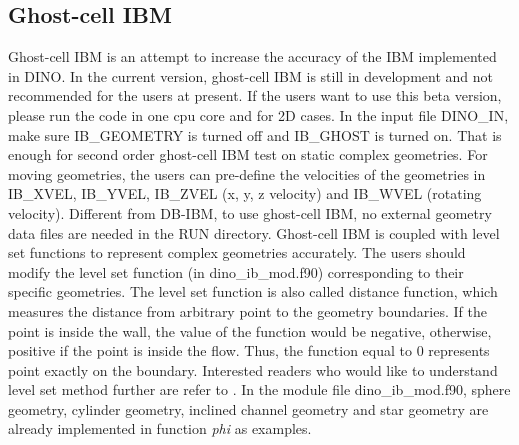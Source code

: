 \subsection{Ghost-cell IBM}
Ghost-cell IBM is an attempt to increase the accuracy of the IBM implemented in DINO. In the current version, ghost-cell IBM is still in development and not recommended for the users at present. If the users want to use this beta version, please run the code in one cpu core and for 2D cases. In the input file DINO\_IN, make sure IB\_GEOMETRY is turned off and IB\_GHOST is turned on. That is enough for second order ghost-cell IBM test on static complex geometries. For moving geometries, the users can pre-define the velocities of the geometries in IB\_XVEL, IB\_YVEL, IB\_ZVEL (x, y, z velocity) and IB\_WVEL (rotating velocity).
Different from DB-IBM, to use ghost-cell IBM, no external geometry data files are needed in the RUN directory. Ghost-cell IBM is coupled with level set functions to represent complex geometries accurately. The users should modify the level set function (in dino\_ib\_mod.f90) corresponding to their specific geometries. The level set function is also called distance function, which measures the distance from arbitrary point to the geometry boundaries. If the point is inside the wall, the value of the function would be negative, otherwise, positive if the point is inside the flow. Thus, the function equal to 0 represents point exactly on the boundary. Interested readers who would like to understand level set method further are refer to \cite{Osher2003, Sethian1999}. In the module file dino\_ib\_mod.f90, sphere geometry, cylinder geometry, inclined channel geometry and star geometry are already implemented in function \textit{phi} as examples.
